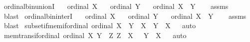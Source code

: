 \begin{isabellebody}
\isanewline
{}\isamarkupfalse%
\ ordinal{\isacharunderscore}{\kern0pt}bin{\isacharunderscore}{\kern0pt}unionI{\isacharcolon}{\kern0pt}\isanewline
\ \ \ {\isachardoublequoteopen}ordinal\ X{\isachardoublequoteclose}\isanewline
\ \ \ {\isachardoublequoteopen}ordinal\ Y{\isachardoublequoteclose}\isanewline
\ \ \ {\isachardoublequoteopen}ordinal\ {\isacharparenleft}{\kern0pt}X\ {\isasymunion}\ Y{\isacharparenright}{\kern0pt}{\isachardoublequoteclose}\isanewline
%
\isadelimproof
\ \ %
\endisadelimproof
%
\isatagproof
{}\isamarkupfalse%
\ assms\ \isamarkupfalse%
\ blast%
\endisatagproof
{\isafoldproof}%
%
\isadelimproof
\isanewline
%
\endisadelimproof
\isanewline
{}\isamarkupfalse%
\ ordinal{\isacharunderscore}{\kern0pt}bin{\isacharunderscore}{\kern0pt}interI{\isacharcolon}{\kern0pt}\isanewline
\ \ \ {\isachardoublequoteopen}ordinal\ X{\isachardoublequoteclose}\isanewline
\ \ \ {\isachardoublequoteopen}ordinal\ Y{\isachardoublequoteclose}\isanewline
\ \ \ {\isachardoublequoteopen}ordinal\ {\isacharparenleft}{\kern0pt}X\ {\isasyminter}\ Y{\isacharparenright}{\kern0pt}{\isachardoublequoteclose}\isanewline
%
\isadelimproof
\ \ %
\endisadelimproof
%
\isatagproof
{}\isamarkupfalse%
\ assms\ \isamarkupfalse%
\ blast%
\endisatagproof
{\isafoldproof}%
%
\isadelimproof
\isanewline
%
\endisadelimproof
\isanewline
{}\isamarkupfalse%
\ subset{\isacharunderscore}{\kern0pt}if{\isacharunderscore}{\kern0pt}mem{\isacharunderscore}{\kern0pt}if{\isacharunderscore}{\kern0pt}ordinal{\isacharcolon}{\kern0pt}\ {\isachardoublequoteopen}ordinal\ X\ {\isasymLongrightarrow}\ Y\ {\isasymin}\ X\ {\isasymLongrightarrow}\ Y\ {\isasymsubseteq}\ X{\isachardoublequoteclose}%
\isadelimproof
\ %
\endisadelimproof
%
\isatagproof
{}\isamarkupfalse%
\ auto%
\endisatagproof
{\isafoldproof}%
%
\isadelimproof
%
\endisadelimproof
\isanewline
\isanewline
{}\isamarkupfalse%
\ mem{\isacharunderscore}{\kern0pt}trans{\isacharunderscore}{\kern0pt}if{\isacharunderscore}{\kern0pt}ordinal{\isacharcolon}{\kern0pt}\ {\isachardoublequoteopen}{\isasymlbrakk}ordinal\ X{\isacharsemicolon}{\kern0pt}\ Y\ {\isasymin}\ Z{\isacharsemicolon}{\kern0pt}\ Z\ {\isasymin}\ X{\isasymrbrakk}\ \ {\isasymLongrightarrow}\ Y\ {\isasymin}\ X{\isachardoublequoteclose}%
\isadelimproof
\ %
\endisadelimproof
%
\isatagproof
{}\isamarkupfalse%
\ auto%
\endisatagproof
{\isafoldproof}%
%

\end{isabellebody}
